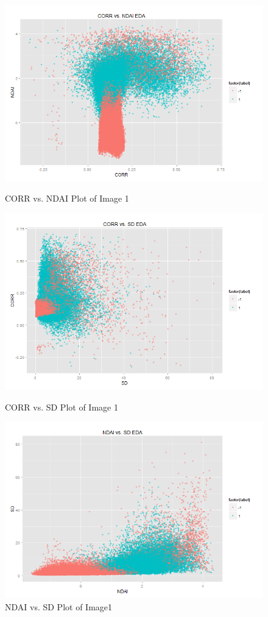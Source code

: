 \documentclass{article}\usepackage[]{graphicx}\usepackage[]{color}
\begin{document}
\begin{figure}[h]
  \includegraphics[width=\linewidth]{CORRvsNDAI.png}
  \caption{CORR vs. NDAI Plot of Image 1}\label{}
\endminipage\hfill
{}
  \includegraphics[width=\linewidth]{CORRvsSD.png}
  \caption{CORR vs. SD Plot of Image 1}\label{}
\endminipage\hfill
{}%
  \includegraphics[width=\linewidth]{NDAIvsSD.png}
  \caption{NDAI vs. SD Plot of Image1}\label{}
\endminipage
\end{figure}
\end{document}
